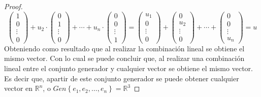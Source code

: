 \documentclass{article}
\begin{document}
\begin{enumerate}
\begin{proof}
\[                \begin{pmatrix}
                    1 \\ 0 \\ \vdots \\ 0
                \end{pmatrix}
                +u_2
                \cdot
                \begin{pmatrix}
                    0 \\ 1 \\ \vdots \\ 0
                \end{pmatrix}
                +
                \cdots
                +u_n
                \cdot
                \begin{pmatrix}
                    0 \\ 0 \\ \vdots \\ 1
                \end{pmatrix}
                =
                \begin{pmatrix}
                    u_1 \\ 0 \\ \vdots \\ 0
                \end{pmatrix}
                +
                \begin{pmatrix}
                    0 \\ u_2 \\ \vdots \\ 0
                \end{pmatrix}
                +
                \cdots
                +
                \begin{pmatrix}
                    0 \\ 0 \\ \vdots \\ u_n
                \end{pmatrix}
                =
                u
            \]
            Obteniendo como resultado que al realizar la combinación lineal se obtiene el mismo vector.
            Con lo cual se puede concluir que, al realizar una combinación lineal entre el conjunto generador y cualquier vector se obtiene el mismo vector.
            Es decir que, apartir de este conjunto generador se puede obtener cualquier vector en \(\mathbb{R}^n\), o \(Gen\left\{e_1, e_2, \dots, e_n\right\} = \mathbb{R}^3\)
        \end{proof}

\end{enumerate}
\end{document}
